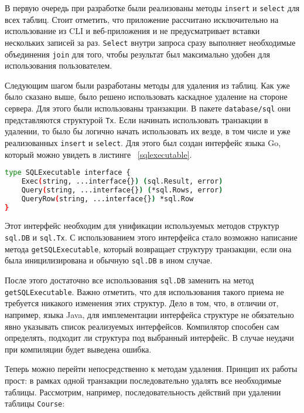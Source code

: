 В первую очередь при разработке были реализованы методы \texttt{insert} и \texttt{select} для всех таблиц.
Стоит отметить, что приложение рассчитано исключительно на использование из CLI и веб-приложения и не
предусматривает вставки нескольких записей за раз. \texttt{Select} внутри запроса сразу выполняет
необходимые объединения \texttt{join} для того, чтобы результат был максимально удобен для
использования пользователем.

Следующим шагом были разработаны методы для удаления из таблиц. Как уже было сказано выше,
было решено использовать каскадное удаление на стороне сервера. Для этого были использованы
транзакции. В пакете \texttt{database/sql} они представляются структурой \texttt{Tx}.
Если начинать использовать транзакции в удалении, то было бы логично начать использовать их везде, в том числе
и уже реализованных \texttt{insert} и \texttt{select}. Для этого был создан интерфейс языка Go, который можно увидеть в листинге ~\ref{sqlexecutable}.

\begin{lstlisting}[language=bash, caption = {Интерфейс унификации транзакций.}, captionpos=b, label={sqlexecutable}]
type SQLExecutable interface {
	Exec(string, ...interface{}) (sql.Result, error)
	Query(string, ...interface{}) (*sql.Rows, error)
	QueryRow(string, ...interface{}) *sql.Row
}
\end{lstlisting}

Этот интерфейс необходим для унификации используемых методов структур \texttt{sql.DB} и \texttt{sql.Tx}.
С использованием этого интерфейса стало возможно написание метода \texttt{getSQLExecutable}, который
возвращает структуру транзакции, если она была иницилизирована и обычную \texttt{sql.DB} в ином случае.

После этого достаточно все использования \texttt{sql.DB} заменить на метод \texttt{getSQLExecutable}.
Важно отметить, что для использования такого приема не требуется никакого изменения этих структур.
Дело в том, что, в отличии от, например, языка Java, для имплементации интерфейса структуре не
обязательно явно указывать список реализуемых интерфейсов. Компилятор способен сам определять, подходит
ли структура под выбранный интерфейс. В случае неудачи при компиляции будет выведена ошибка.

Теперь можно перейти непосредственно к методам удаления. Принцип их работы прост: в рамках одной
транзакции последовательно удалять все необходимые таблицы. Рассмотрим, например, последовательность действий
при удалении таблицы \texttt{Course}:

